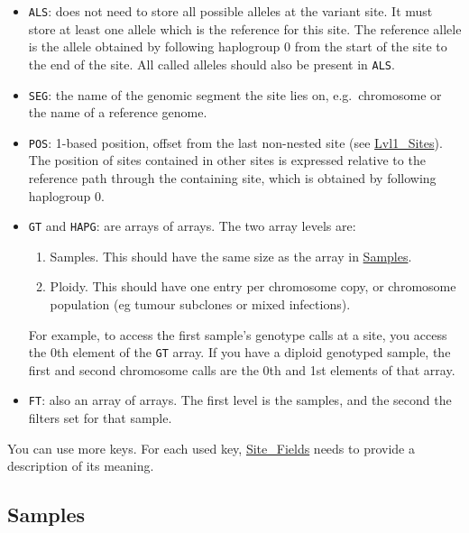 \begin{itemize}
\item
  \texttt{ALS}: does not need to store all possible alleles at the
  variant site. It must store at least one allele which is the reference
  for this site. The reference allele is the allele obtained by
  following haplogroup 0 from the start of the site to the end of the
  site. All called alleles should also be present in \texttt{ALS}.
\item
  \texttt{SEG}: the name of the genomic segment the site lies on,
  e.g.~chromosome or the name of a reference genome.
\item
  \texttt{POS}: 1-based position, offset from the last non-nested site
  (see \protect\hyperlink{lvl1_sites}{Lvl1\_Sites}). The position of
  sites contained in other sites is expressed relative to the reference
  path through the containing site, which is obtained by following
  haplogroup 0.
\item
  \texttt{GT} and \texttt{HAPG}: are arrays of arrays. The two array
  levels are:

  \begin{enumerate}
  \def\labelenumi{\arabic{enumi}.}
  \tightlist
  \item
    Samples. This should have the same size as the array in
    \protect\hyperlink{samples}{Samples}.
  \item
    Ploidy. This should have one entry per chromosome copy, or
    chromosome population (eg tumour subclones or mixed infections).
  \end{enumerate}

  For example, to access the first sample's genotype calls at a site,
  you access the 0th element of the \texttt{GT} array. If you have a
  diploid genotyped sample, the first and second chromosome calls are
  the 0th and 1st elements of that array.
\item
  \texttt{FT}: also an array of arrays. The first level is the samples,
  and the second the filters set for that sample.
\end{itemize}

You can use more keys. For each used key,
\protect\hyperlink{site_fields}{Site\_Fields} needs to provide a
description of its meaning.

\hypertarget{samples}{%
\subsection{Samples}\label{samples}}

